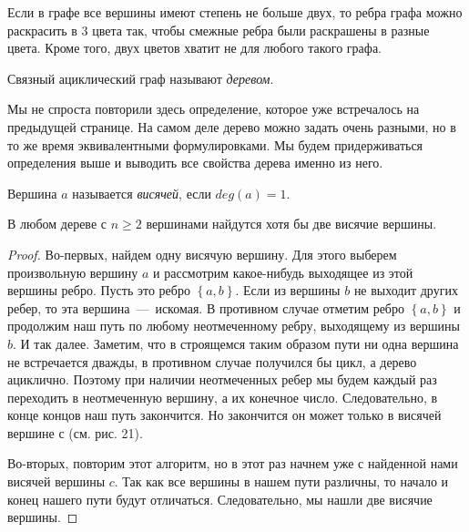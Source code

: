 \begin{consequence}
	Если в графе все вершины имеют степень не больше двух, то ребра графа можно раскрасить в $3$ цвета так, чтобы смежные ребра были раскрашены в разные цвета. Кроме того, двух цветов хватит не для любого такого графа.
\end{consequence}


\begin{definition}
	Связный ациклический граф называют \emph{деревом}.
\end{definition}

	Мы не спроста повторили здесь определение, которое уже встречалось на предыдущей странице. На самом деле дерево можно задать очень разными, но в то же время эквивалентными формулировками. Мы будем придерживаться определения выше и выводить все свойства дерева именно из него.

\begin{definition}
	Вершина $a$ называется \emph{висячей}, если $deg(a) = 1$.
\end{definition}

\begin{lemma}
	В любом дереве с $n \geqslant 2$ вершинами найдутся хотя бы две висячие вершины.
	
\begin{proof}	
	 Во-первых, найдем одну висячую вершину. Для этого выберем произвольную вершину $a$ и рассмотрим какое-нибудь выходящее из этой вершины ребро. Пусть это ребро $\left\lbrace a, b \right\rbrace$. Если из вершины $b$ не выходит других ребер, то эта вершина~---~искомая. В противном случае отметим ребро $\left\lbrace a, b \right\rbrace$ и продолжим наш путь по любому неотмеченному ребру, выходящему из вершины $b$. И так далее. Заметим, что в строящемся таким образом пути ни одна вершина не встречается дважды, в противном случае получился бы цикл, а дерево ациклично. Поэтому при наличии неотмеченных ребер мы будем каждый раз переходить в неотмеченную вершину, а их конечное число. Следовательно, в конце концов наш путь закончится. Но закончится он может только в висячей вершине $с$ (см. рис. 21). 
	
	Во-вторых, повторим этот алгоритм, но в этот раз начнем уже с найденной нами висячей вершины $c$. Так как все вершины в нашем пути различны, то начало и конец нашего пути будут отличаться. Следовательно, мы нашли две висячие вершины.
\end{proof}
\end{lemma}

